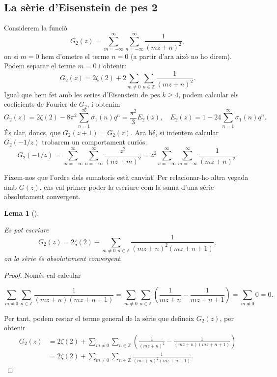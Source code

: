 \documentclass[
  letterpaper,
  DIV=11,
  numbers=noendperiod]{scrreprt}
\theoremstyle{plain}
\theoremstyle{plain}
\theoremstyle{definition}
\theoremstyle{plain}
\theoremstyle{plain}
\newtheorem{lemma}{Lema}[chapter]
\theoremstyle{definition}
\theoremstyle{remark}
\begin{document}
\subsection{La sèrie d'Eisenstein de pes
2}\label{la-suxe8rie-deisenstein-de-pes-2}

Considerem la funció \[
G_2(z) = \sum_{m=-\infty}^\infty \sum_{n=-\infty}^\infty \frac{1}{(mz+n)^2},
\] on si \(m=0\) hem d'ometre el terme \(n=0\) (a partir d'ara això no
ho direm). Podem separar el terme \(m=0\) i obtenir: \[
G_2(z) = 2\zeta(2) + 2\sum_{m\neq 0}\sum_{n\in\mathbb{Z}} \frac{1}{(mz+n)^2}.
\] Igual que hem fet amb les series d'Eisenstein de pes \(k\geq 4\),
podem calcular els coeficients de Fourier de \(G_2\), i obtenim \[
G_2(z)= 2\zeta(2)  - 8\pi^2\sum_{n=1}^\infty \sigma_1(n)q^n=\frac{\pi^2}{3} E_2(z),\quad E_2(z)=1-24\sum_{n=1}^\infty \sigma_1(n)q^n.
\] És clar, doncs, que \(G_2(z+1)=G_2(z)\). Ara bé, si intentem calcular
\(G_2(-1/z)\) trobarem un comportament curiós: \[
G_2(-1/z) = \sum_{m=-\infty}^\infty\sum_{n=-\infty}^\infty \frac{z^2}{(nz+m)^2} = z^2\sum_{n=-\infty}^\infty\sum_{m=-\infty}^\infty \frac{1}{(mz+n)^2}.
\]

Fixem-nos que l'ordre dels sumatoris està canviat! Per relacionar-ho
altra vegada amb \(G(z)\), ens cal primer poder-la escriure com la suma
d'una sèrie absolutament convergent.

\begin{lemma}[]\protect\hypertarget{lem-}{}\label{lem-}

Es pot escriure \[
G_2(z) = 2\zeta(2) + \sum_{m\neq 0,n\in\mathbb{Z}}\frac{1}{(mz+n)^2(mz+n+1)},
\] on la sèrie és absolutament convergent.

\end{lemma}

\begin{proof}
Només cal calcular

\[
\sum_{m\neq 0}\sum_{n\in\mathbb{Z}} \frac{1}{(mz+n)(mz+n+1)} = \sum_{m\neq 0}\sum_{n\in\mathbb{Z}} \left(\frac{1}{mz+n}-\frac{1}{mz+n+1}\right) = \sum_{m\neq 0} 0 = 0.
\]

Per tant, podem restar el terme general de la sèrie que defineix
\(G_2(z)\), per obtenir \begin{align*}
G_2(z) &= 2\zeta(2) + \sum_{m\neq 0}\sum_{n\in\mathbb{Z}} \left(\frac{1}{(mz+n)^2}-\frac{1}{(mz+n)(mz+n+1)}\right)\\
&=2\zeta(2)+\sum_{m\neq 0
}\sum_{n\in\mathbb{Z}}\frac{1}{(mz+n)^2(mz+n+1)}.
\end{align*}
\end{proof}
\end{document}
